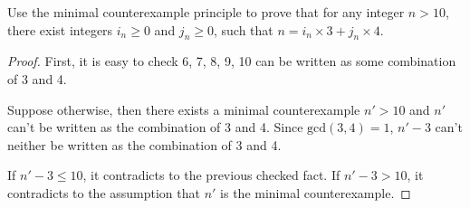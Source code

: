 \begin{exercise}[]{Use the minimal counterexample principle to prove that for any integer $n > 10$, there exist integers $i_n\geq0$ and $j_n\geq 0$, such that $n = i_n \times 3 + j_n \times 4$.}
  \begin{proof}
     First, it is easy to check 6, 7, 8, 9, 10 can be written as some combination of 3 and 4.

     Suppose otherwise, then there exists a minimal counterexample $n'>10$ and $n'$ can't be written as the combination of 3 and 4. Since $\text{gcd}(3,4)=1$,  $n' - 3$ can't neither be written as the combination of 3 and 4.
     
     If $n' - 3 \le 10$, it contradicts to the previous checked fact. If $n' -3 > 10$, it contradicts to the assumption that $n'$ is the minimal counterexample.
  \end{proof}
  \label{ex4}
\end{exercise}


